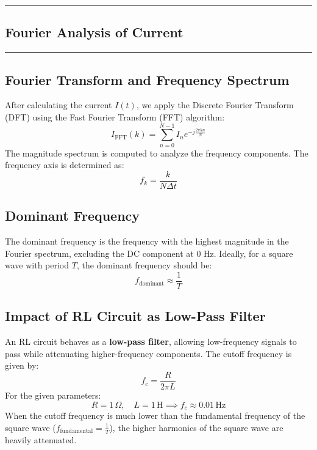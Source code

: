 \newpage
{\color{gray}\hrule}
\begin{center}
\section{Fourier Analysis of Current}
\bigskip
\end{center}
{\color{gray}\hrule}
\begin{multicols}{2}
\subsection{Fourier Transform and Frequency Spectrum}
After calculating the current $I(t)$, we apply the Discrete Fourier Transform (DFT) using the Fast Fourier Transform (FFT) algorithm:
\begin{equation}
I_{\text{FFT}}(k) = \sum_{n=0}^{N-1} I_n e^{-j \frac{2 \pi k n}{N}}
\end{equation}
The magnitude spectrum is computed to analyze the frequency components. The frequency axis is determined as:
\begin{equation}
f_k = \frac{k}{N \Delta t}
\end{equation}
\subsection{Dominant Frequency}
The dominant frequency is the frequency with the highest magnitude in the Fourier spectrum, excluding the DC component at 0 Hz. Ideally, for a square wave with period $T$, the dominant frequency should be:
\begin{equation}
f_{\text{dominant}} \approx \frac{1}{T}
\end{equation}

\subsection{Impact of RL Circuit as Low-Pass Filter}
An RL circuit behaves as a \textbf{low-pass filter}, allowing low-frequency signals to pass while attenuating higher-frequency components. The cutoff frequency is given by:
\begin{equation}
f_c = \frac{R}{2 \pi L}
\end{equation}
For the given parameters:
\begin{equation}
R = 1 \, \Omega, \quad L = 1 \, \text{H} \implies f_c \approx 0.01 \, \text{Hz}
\end{equation}
When the cutoff frequency is much lower than the fundamental frequency of the square wave ($f_{\text{fundamental}} = \frac{1}{T}$), the higher harmonics of the square wave are heavily attenuated. 


\end{multicols}
